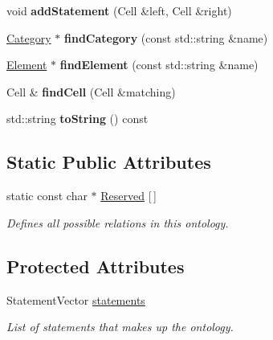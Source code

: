 \begin{DoxyCompactItemize}
\item 
\hypertarget{class_ontology_ac40bc219ffd7ad8911e6d965f4dcd5c4}{void {\bfseries add\-Statement} (\-Cell \&left, \-Cell \&right)}\label{class_ontology_ac40bc219ffd7ad8911e6d965f4dcd5c4}

\item 
\hypertarget{class_ontology_a13d63841c74748a05bd3b9e56fd06271}{\hyperlink{class_category}{\-Category} $\ast$ {\bfseries find\-Category} (const std\-::string \&name)}\label{class_ontology_a13d63841c74748a05bd3b9e56fd06271}

\item 
\hypertarget{class_ontology_a3e9fbd69bbf6f774b8dff245addd5b57}{\hyperlink{class_element}{\-Element} $\ast$ {\bfseries find\-Element} (const std\-::string \&name)}\label{class_ontology_a3e9fbd69bbf6f774b8dff245addd5b57}

\item 
\hypertarget{class_ontology_ab7ff21cfb9c281ac09b161347dfa286b}{\-Cell \& {\bfseries find\-Cell} (\-Cell \&matching)}\label{class_ontology_ab7ff21cfb9c281ac09b161347dfa286b}

\item 
\hypertarget{class_ontology_adf686e0ef260bfe36542fd3d239d3d8f}{std\-::string {\bfseries to\-String} () const }\label{class_ontology_adf686e0ef260bfe36542fd3d239d3d8f}

\end{DoxyCompactItemize}
\subsection*{\-Static \-Public \-Attributes}
\begin{DoxyCompactItemize}
\item 
static const char $\ast$ \hyperlink{class_ontology_a68187ced293d40e2d1e5315c284184a8}{\-Reserved} \mbox{[}$\,$\mbox{]}
\begin{DoxyCompactList}\small\item\em \-Defines all possible relations in this ontology. \end{DoxyCompactList}\end{DoxyCompactItemize}
\subsection*{\-Protected \-Attributes}
\begin{DoxyCompactItemize}
\item 
\hypertarget{class_ontology_a4c7a0da29421df3c0a4564a90c07ea3c}{\-Statement\-Vector \hyperlink{class_ontology_a4c7a0da29421df3c0a4564a90c07ea3c}{statements}}\label{class_ontology_a4c7a0da29421df3c0a4564a90c07ea3c}

\begin{DoxyCompactList}\small\item\em \-List of statements that makes up the ontology. \end{DoxyCompactList}\end{DoxyCompactItemize}
